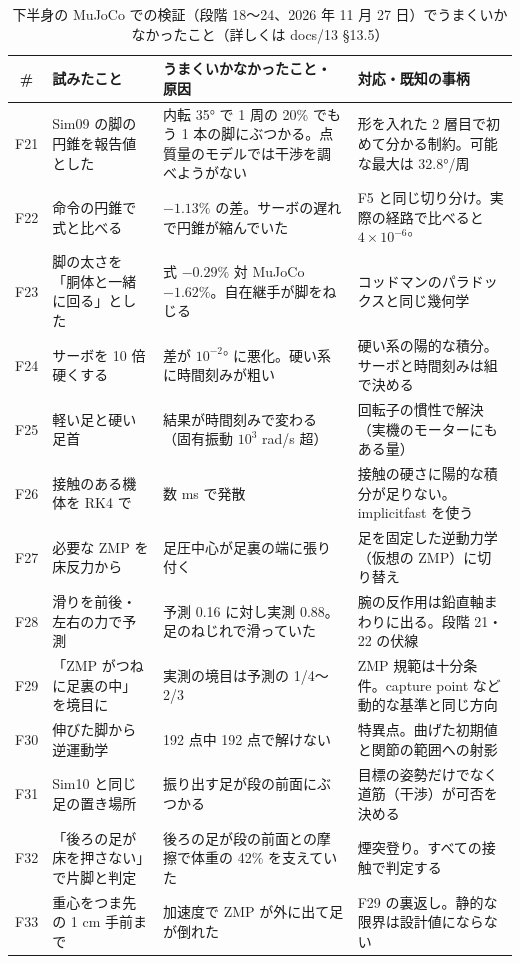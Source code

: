 \documentclass[paper=a4paper,fontsize=10pt,twocolumn,column_gap=2zw,line_length=24zw,number_of_lines=46,head_space=20mm]{jlreq}
\begin{document}
\begin{table}[t]\centering\footnotesize
\caption{下半身の MuJoCo での検証（段階 18〜24、2026 年 11 月 27 日）でうまくいかなかったこと（詳しくは docs/13 §13.5）}\label{tab:fail3}
\setlength{\tabcolsep}{3pt}
\begin{tabular}{cp{}p{}p{}}\toprule
\# & 試みたこと & うまくいかなかったこと・原因 & 対応・既知の事柄 \\\midrule
F21 & Sim09 の脚の円錐を報告値とした & 内転 35° で 1 周の 20\% でもう 1 本の脚にぶつかる。点質量のモデルでは干渉を調べようがない & 形を入れた 2 層目で初めて分かる制約。可能な最大は 32.8°/周 \\
F22 & 命令の円錐で式と比べる & $-1.13\%$ の差。サーボの遅れで円錐が縮んでいた & F5 と同じ切り分け。実際の経路で比べると $4\times10^{-6}$° \\
F23 & 脚の太さを「胴体と一緒に回る」とした & 式 $-0.29\%$ 対 MuJoCo $-1.62\%$。自在継手が脚をねじる & コッドマンのパラドックスと同じ幾何学 \\
F24 & サーボを 10 倍硬くする & 差が $10^{-2}$° に悪化。硬い系に時間刻みが粗い & 硬い系の陽的な積分。サーボと時間刻みは組で決める \\
F25 & 軽い足と硬い足首 & 結果が時間刻みで変わる（固有振動 $10^3$ rad/s 超） & 回転子の慣性で解決（実機のモーターにもある量） \\
F26 & 接触のある機体を RK4 で & 数 ms で発散 & 接触の硬さに陽的な積分が足りない。implicitfast を使う \\
F27 & 必要な ZMP を床反力から & 足圧中心が足裏の端に張り付く & 足を固定した逆動力学（仮想の ZMP）に切り替え \\
F28 & 滑りを前後・左右の力で予測 & 予測 0.16 に対し実測 0.88。足のねじれで滑っていた & 腕の反作用は鉛直軸まわりに出る。段階 21・22 の伏線 \\
F29 & 「ZMP がつねに足裏の中」を境目に & 実測の境目は予測の 1/4〜2/3 & ZMP 規範は十分条件。capture point など動的な基準と同じ方向 \\
F30 & 伸びた脚から逆運動学 & 192 点中 192 点で解けない & 特異点。曲げた初期値と関節の範囲への射影 \\
F31 & Sim10 と同じ足の置き場所 & 振り出す足が段の前面にぶつかる & 目標の姿勢だけでなく道筋（干渉）が可否を決める \\
F32 & 「後ろの足が床を押さない」で片脚と判定 & 後ろの足が段の前面との摩擦で体重の 42\% を支えていた & 煙突登り。すべての接触で判定する \\
F33 & 重心をつま先の 1 cm 手前まで & 加速度で ZMP が外に出て足が倒れた & F29 の裏返し。静的な限界は設計値にならない \\

\end{tabular}
\end{table}
\end{document}
